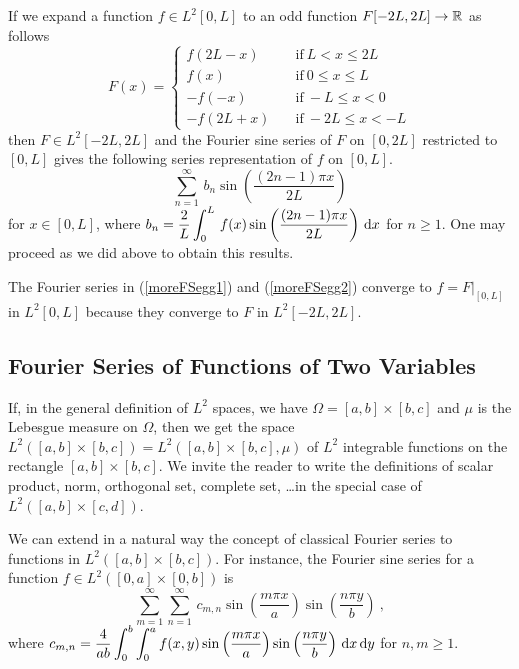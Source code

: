 If we expand a function $\displaystyle f \in L^2[0,L]$ to an odd function
$F[-2L,2L]\rightarrow \mathbb{R}$ as follows
\[
F(x) = \begin{cases}
f(2L-x) & \quad \text{if} \ L<x\leq 2L \\
f(x) &  \quad \text{if} \ 0 \leq x\leq L \\
-f(-x) & \quad \text{if} \ -L\leq x < 0 \\
-f(2L+x) & \quad \text{if} \ -2L\leq x < -L
\end{cases}
\]
then $\displaystyle F\in L^2[-2L,2L]$ and the Fourier sine series of $F$ on
$[0,2L]$ restricted to $[0,L]$ gives the following series
representation of $f$ on $[0,L]$.
\begin{equation} \label{moreFSegg2}
\sum_{n=1}^{\infty} \, b_n \sin\left(\frac{(2n-1)\pi x}{2L}\right)
\end{equation}
for $x\in [0,L]$, where
$\displaystyle b_n = \frac{2}{L} \int_{0}^{L} \, f(x)
\sin\left(\frac{(2n-1)\pi x}{2L}\right) \,\mathrm{d}{x}$ for $n \geq 1$.
One may proceed as we did above to obtain this results.

The Fourier series in (\ref{moreFSegg1}) and (\ref{moreFSegg2})
converge to $\displaystyle f = F\big|_{[0,L]}$ in $\displaystyle L^2[0,L]$
because they converge to $F$ in $\displaystyle L^2[-2L,2L]$.

\subsection{Fourier Series of Functions of Two Variables}

If, in the general definition of $\displaystyle L^2$ spaces, we have
$\Omega =[a,b]\times[b,c]$ and $\mu$ is the Lebesgue measure on
$\Omega$, then we get the space
$\displaystyle L^2([a,b]\times[b,c]) = L^2([a,b]\times[b,c],\mu)$ of
$\displaystyle L^2$ integrable functions on the rectangle
$[a,b]\times[b,c]$.  We invite the reader
to write the definitions of scalar product, norm, orthogonal set,
complete set, \ldots in the special case of
$\displaystyle L^2([a,b]\times[c,d])$.

We can extend in a natural way the concept of classical Fourier series
to functions in $\displaystyle L^2([a,b]\times[b,c])$.  For instance,
the Fourier sine series for a function
$\displaystyle f \in L^2([0,a]\times[0,b])$ is
\[
\sum_{m=1}^{\infty} \sum_{n=1}^{\infty} \, c_{m,n}
\sin\left(\frac{m \pi x}{a} \right)\sin\left(\frac{n \pi y}{b} \right)
\ ,
\]
where $\displaystyle c_{m,n} = \frac{4}{ab} \int_{0}^{b} \int_{0}^{a} f(x,y)
\sin \left(\frac{m \pi x}{a}\right) \sin\left(\frac{n \pi y}{b}\right)
\,\mathrm{d}{x}\,\mathrm{d}{y}$ for $n,m \geq 1$.

